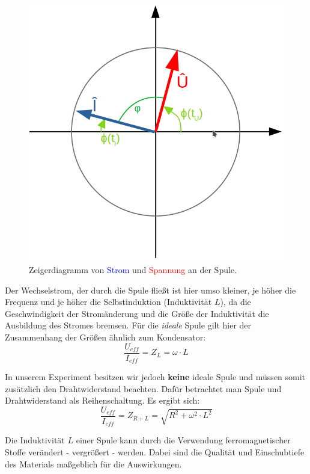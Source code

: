 \documentclass[10pt,a4paper]{article}
\begin{document}
\begin{flushleft}
\begin{itemize}
\begin{figure}[H]
\centering
\includegraphics[scale=0.4]{Zeiger_spule}
\caption{Zeigerdiagramm von \textcolor{blue}{Strom} und \textcolor{red}{Spannung} an der Spule.}
\label{fig:zeiger_spule}
\end{figure}

Der Wechselstrom, der durch die Spule fließt ist hier umso kleiner, je höher die Frequenz und je höher die Selbstinduktion (Induktivität $L$), da die Geschwindigkeit der Stromänderung und die Größe der Induktivität die Ausbildung des Stromes bremsen. Für die \textit{ideale} Spule gilt hier der Zusammenhang der Größen ähnlich zum Kondensator:
\begin{equation}\label{eq:spule_id}
\frac{U_{eff}}{I_{eff}} = Z_L = \omega \cdot L
\end{equation}

In unserem Experiment besitzen wir jedoch \textbf{keine} ideale Spule und müssen somit zusätzlich den Drahtwiderstand beachten. Dafür betrachtet man Spule und Drahtwiderstand als Reihenschaltung. Es ergibt sich:
\begin{equation}\label{eq:spule}
\frac{U_{eff}}{I_{eff}} = Z_{R+L} = \sqrt{R^{2} + \omega^2 \cdot L^2}
\end{equation}

Die Induktivität $L$ einer Spule kann durch die Verwendung ferromagnetischer Stoffe verändert - vergrößert - werden. Dabei sind die Qualität und Einschubtiefe des Materials maßgeblich für die Auswirkungen.


\end{itemize}
\end{flushleft}
\end{document}
